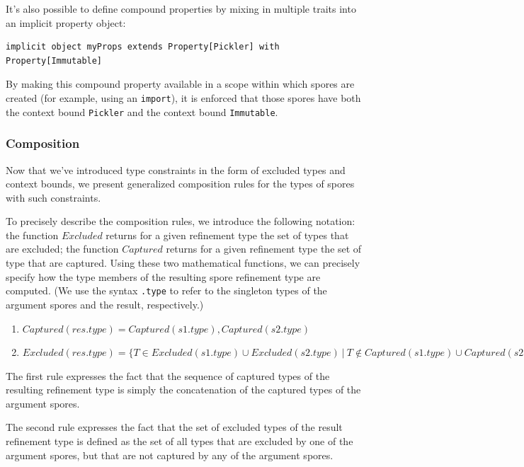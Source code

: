 \documentclass{llncs}
\begin{document}
It's also possible to define compound properties by mixing in multiple traits
into an implicit property object:

\begin{lstlisting}[numbers=none]
    implicit object myProps extends Property[Pickler] with Property[Immutable]
\end{lstlisting}

By making this compound property available in a scope within which spores are
created (for example, using an \verb|import|), it is enforced that those
spores have both the context bound \verb|Pickler| and the context bound
\verb|Immutable|.


\subsubsection{Composition}

Now that we've introduced type constraints in the form of excluded types and context bounds, we present generalized composition rules for the types of spores with such constraints.

To precisely describe the composition rules, we introduce the following notation: the function $Excluded$ returns for a given refinement type the set of types that are excluded; the function $Captured$ returns for a given refinement type the set of type that are captured. Using these two mathematical functions, we can precisely specify how the type members of the resulting spore refinement type are computed. (We use the syntax \verb|.type| to refer to the singleton types of the argument spores and the result, respectively.)

\vspace{-5mm}
\begin{enumerate}

\item $Captured(res.type) = Captured(s1.type), Captured(s2.type)$

\item $Excluded(res.type) = \{ T \in Excluded(s1.type) \cup Excluded(s2.type) ~|~ T \notin Captured(s1.type) \cup Captured(s2.type) \}$

\end{enumerate}

The first rule expresses the fact that the sequence of captured types of the resulting refinement type is simply the concatenation of the captured types of the argument spores.

The second rule expresses the fact that the set of excluded types of the result refinement type is defined as the set of all types that are excluded by one of the argument spores, but that are not captured by any of the argument spores.
\end{document}
